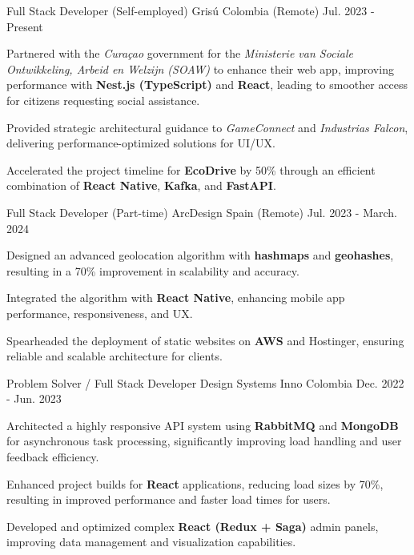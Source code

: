 \begin{cventries}
 \cventry
  {Full Stack Developer (Self-employed)} %
  {Grisú} %
  {Colombia (Remote)} %
  {Jul. 2023 - Present} %
  {
    \begin{cvitems} %
      \item {Partnered with the \textit{Curaçao} government for the \textit{Ministerie van Sociale Ontwikkeling, Arbeid en Welzijn (SOAW)} to enhance their web app, improving performance with \textbf{Nest.js (TypeScript)} and \textbf{React}, leading to smoother access for citizens requesting social assistance.}
      \item {Provided strategic architectural guidance to \textit{GameConnect} and \textit{Industrias Falcon}, delivering performance-optimized solutions for UI/UX.}
      \item {Accelerated the project timeline for \textbf{EcoDrive} by 50\% through an efficient combination of \textbf{React Native}, \textbf{Kafka}, and \textbf{FastAPI}.}
    \end{cvitems}
  }
  \cventry
  {Full Stack Developer (Part-time)} %
  {ArcDesign} %
  {Spain (Remote)} %
  {Jul. 2023 - March. 2024} %
  {
    \begin{cvitems} %
      \item {Designed an advanced geolocation algorithm with \textbf{hashmaps} and \textbf{geohashes}, resulting in a 70\% improvement in scalability and accuracy.}
      \item {Integrated the algorithm with \textbf{React Native}, enhancing mobile app performance, responsiveness, and UX.}
      \item {Spearheaded the deployment of static websites on \textbf{AWS} and Hostinger, ensuring reliable and scalable architecture for clients.}
    \end{cvitems}
  }

  \cventry
  {Problem Solver / Full Stack Developer} %
  {Design Systems Inno} %
  {Colombia} %
  {Dec. 2022 - Jun. 2023} %
  {
    \begin{cvitems} %
      \item {Architected a highly responsive API system using \textbf{RabbitMQ} and \textbf{MongoDB} for asynchronous task processing, significantly improving load handling and user feedback efficiency.}
      \item {Enhanced project builds for \textbf{React} applications, reducing load sizes by 70\%, resulting in improved performance and faster load times for users.}
      \item {Developed and optimized complex \textbf{React (Redux + Saga)} admin panels, improving data management and visualization capabilities.}
    \end{cvitems}
  }


\end{cventries}
